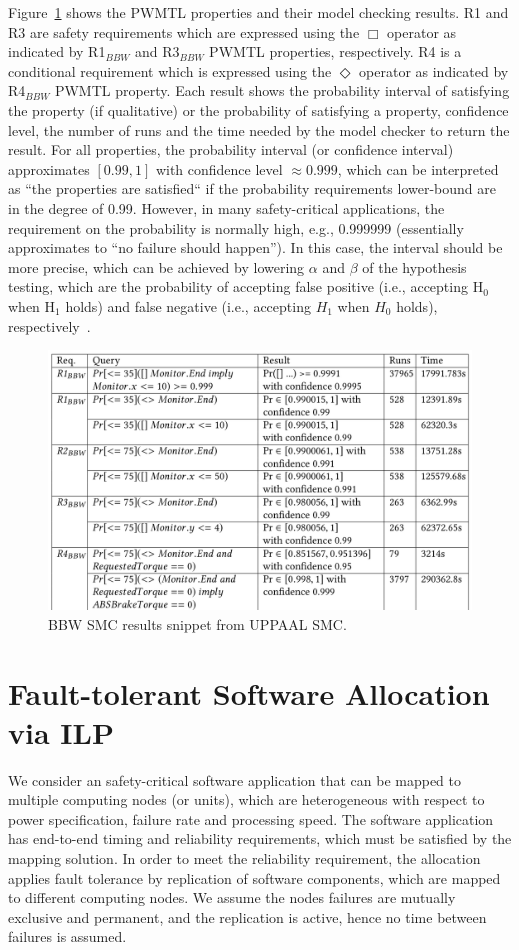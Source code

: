 Figure~\ref{fig_smcresult} shows the PWMTL properties and their model checking results. R1 and R3 are safety requirements which are expressed using the $\Box$ operator as indicated by R1$_{BBW}$ and R3$_{BBW}$ PWMTL properties, respectively. R4 is a conditional requirement which is expressed using the $\Diamond$ operator as indicated by R4$_{BBW}$ PWMTL property. Each result shows the probability interval of satisfying the property (if qualitative) or the probability of satisfying a property, confidence level, the number of runs and the time needed by the model checker to return the result. For all properties, the probability interval (or confidence interval) approximates $[0.99,1]$ with confidence level $\approx0.999$, which can be interpreted as ``the properties are satisfied`` if the probability requirements lower-bound are in the degree of 0.99. However, in many safety-critical applications, the requirement on the probability is normally high, e.g., 0.999999 (essentially approximates to ``no failure should happen''). In this case, the interval should be more precise, which can be achieved by lowering $\alpha$ and $\beta$ of the hypothesis testing, which are the probability of accepting false positive (i.e., accepting H$_0$ when H$_1$ holds) and false negative (i.e., accepting $H_1$ when $H_0$ holds), respectively~\cite{David2011StatisticalAutomata}.
\begin{figure}
	\centering
	\includegraphics[width=0.8\linewidth]{images/smc_result}
	\caption{BBW SMC results snippet from UPPAAL SMC.}
	\label{fig_smcresult}\vspace{-1cm}
\end{figure}

\section{Fault-tolerant Software Allocation via ILP}\label{rc_ilp}
We consider an \autosar{} safety-critical software application that can be mapped to multiple computing nodes (or units), which are heterogeneous with respect to power specification, failure rate and processing speed. The software application has end-to-end timing and reliability requirements, which must be satisfied by the mapping solution. In order to meet the reliability requirement, the allocation applies fault tolerance by replication of software components, which are mapped to different computing nodes. We assume the nodes failures are mutually exclusive and permanent, and the replication is active, hence no time between failures is assumed.

